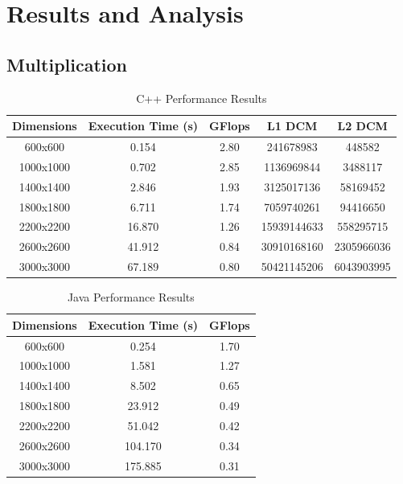 \documentclass{article}
\begin{document}
\section{Results and Analysis}

\subsection{Multiplication}

\begin{table}[H]
\centering
\caption{C++ Performance Results}
\begin{tabular}{||c | c | c | c | c||} 
 \hline
 \textbf{Dimensions} & \textbf{Execution Time (s)} & \textbf{GFlops} & \textbf{L1 DCM} & \textbf{L2 DCM} \\  
 \hline \hline
 600x600  & 0.154   & 2.80   & 241678983   & 448582    \\  
 \hline
 1000x1000 & 0.702   & 2.85   & 1136969844 & 3488117  \\  
 \hline
 1400x1400 & 2.846   & 1.93   & 3125017136 & 58169452 \\  
 \hline
 1800x1800 & 6.711   & 1.74   & 7059740261 & 94416650 \\  
 \hline
 2200x2200 & 16.870  & 1.26   & 15939144633 & 558295715 \\  
 \hline
 2600x2600 & 41.912  & 0.84   & 30910168160 & 2305966036 \\  
 \hline
 3000x3000 & 67.189  & 0.80   & 50421145206 & 6043903995 \\  
 \hline
\end{tabular}
\end{table}

\begin{table}[H]
\centering
\caption{Java Performance Results}
\begin{tabular}{||c | c | c||} 
 \hline
 \textbf{Dimensions} & \textbf{Execution Time (s)} & \textbf{GFlops} \\  
 \hline \hline
 600x600  & 0.254   & 1.70   \\  
 \hline
 1000x1000 & 1.581   & 1.27   \\  
 \hline
 1400x1400 & 8.502   & 0.65   \\  
 \hline
 1800x1800 & 23.912  & 0.49   \\  
 \hline
 2200x2200 & 51.042  & 0.42   \\  
 \hline
 2600x2600 & 104.170 & 0.34   \\  
 \hline
 3000x3000 & 175.885 & 0.31   \\  
 \hline
\end{tabular}
\end{table}
\end{document}
